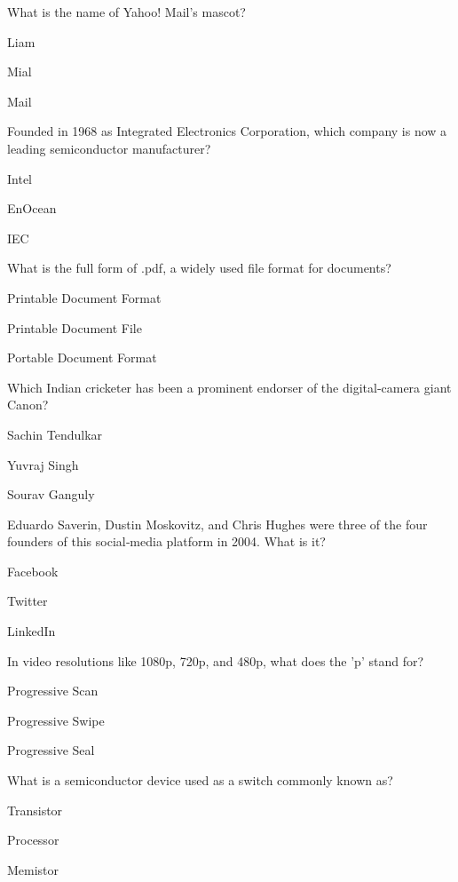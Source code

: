 \begin{enhancedmcq}{What is the name of Yahoo! Mail's mascot?}
\item Liam
\item Mial
\item Mail

\end{enhancedmcq}
\begin{enhancedmcq}{Founded in 1968 as Integrated Electronics Corporation, which company is now a leading semiconductor manufacturer?}
\item Intel
\item EnOcean
\item IEC

\end{enhancedmcq}
\begin{enhancedmcq}{What is the full form of .pdf, a widely used file format for documents?}
\item Printable Document Format
\item Printable Document File
\item Portable Document Format

\end{enhancedmcq}
\begin{enhancedmcq}{Which Indian cricketer has been a prominent endorser of the digital‑camera giant Canon?}
\item Sachin Tendulkar
\item Yuvraj Singh
\item Sourav Ganguly

\end{enhancedmcq}
\begin{enhancedmcq}{Eduardo Saverin, Dustin Moskovitz, and Chris Hughes were three of the four founders of this social‑media platform in 2004. What is it?}
\item Facebook
\item Twitter
\item LinkedIn

\end{enhancedmcq}
\begin{enhancedmcq}{In video resolutions like 1080p, 720p, and 480p, what does the 'p' stand for?}
\item Progressive Scan
\item Progressive Swipe
\item Progressive Seal

\end{enhancedmcq}
\begin{enhancedmcq}{What is a semiconductor device used as a switch commonly known as?}
\item Transistor
\item Processor
\item Memistor

\end{enhancedmcq}
